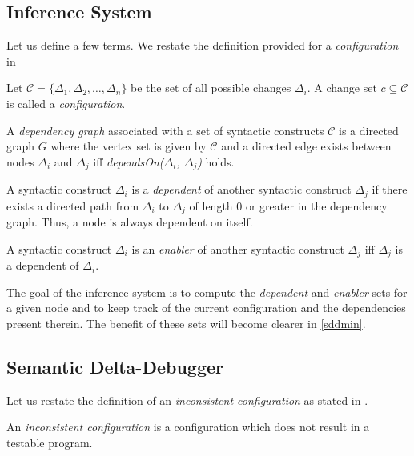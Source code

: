 \documentclass[preprint]{acm_proc_article-sp}
\newenvironment{definition}[1][Definition]{\begin{trivlist}
\item[\hskip \labelsep {\bfseries #1}]}{\end{trivlist}}
\begin{document}
\subsection{Inference System}
Let us define a few terms. We restate the definition provided for a
\emph{configuration} in \citet{zeller99}
\begin{definition}
Let $\mathcal{C} = \{ \Delta_1, \Delta_2, \ldots, \Delta_n \}$ be the set of all
possible changes $\Delta_i$. A change set $c \subseteq \mathcal{C}$ is called a
\emph{configuration}.
\end{definition}

\begin{definition}
A \emph{dependency graph} associated with a set of syntactic constructs
$\mathcal{C}$ is a directed graph $G$ where the vertex set is given by
$\mathcal{C}$ and a directed edge exists between nodes $\Delta_i$ and $\Delta_j$
iff \emph{dependsOn($\Delta_i$, $\Delta_j$)} holds.
\end{definition}

\begin{definition}
A syntactic construct $\Delta_i$ is a \emph{dependent} of another syntactic
construct $\Delta_j$ if there exists a directed path from $\Delta_i$ to
$\Delta_j$ of length $0$ or greater in the dependency graph. Thus, a node is
always dependent on itself.
\end{definition}

\begin{definition}
A syntactic construct $\Delta_i$ is an \emph{enabler} of another syntactic
construct $\Delta_j$ iff $\Delta_j$ is a dependent of $\Delta_i$.
\end{definition}


The goal of the inference system is to compute the \emph{dependent} and
\emph{enabler} sets for a given node and to keep track of the current
configuration and the dependencies present therein. The benefit of these sets will
become clearer in \ref{sddmin}.

\subsection{Semantic Delta-Debugger}
Let us restate the definition of an \emph{inconsistent configuration} as stated
in \citet{zeller99}.
\begin{definition}
An \emph{inconsistent configuration} is a configuration which does not result in
a testable program.
\end{definition}
\end{document}
